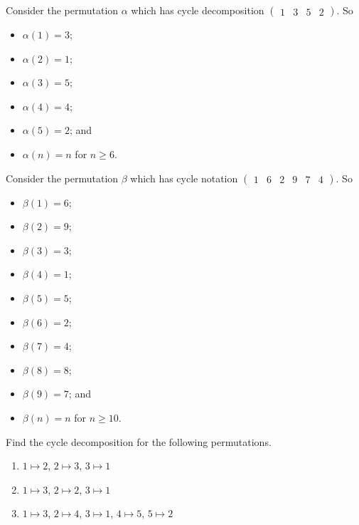 \begin{example}
    Consider the permutation $\alpha$ which has cycle decomposition $\begin{pmatrix}1 & 3 & 5 & 2\end{pmatrix}$. So
    \begin{multicols}{2}
        \begin{itemize}
            \item $\alpha(1) = 3$;
            \item $\alpha(2) = 1$;
            \item $\alpha(3) = 5$;
            \item $\alpha(4) = 4$;
            \item $\alpha(5) = 2$; and
            \item $\alpha(n) = n$ for $n \geq 6$.
        \end{itemize}
    \end{multicols}
\end{example}

\newpage

\begin{example}
    Consider the permutation $\beta$ which has cycle notation $\begin{pmatrix}1 & 6 & 2 & 9 & 7 & 4\end{pmatrix}$. So
    \begin{multicols}{2}
        \begin{itemize}
            \item $\beta(1) = 6$;
            \item $\beta(2) = 9$;
            \item $\beta(3) = 3$;
            \item $\beta(4) = 1$;
            \item $\beta(5) = 5$;
            \item $\beta(6) = 2$;
            \item $\beta(7) = 4$;
            \item $\beta(8) = 8$;
            \item $\beta(9) = 7$; and
            \item $\beta(n) = n$ for $n \geq 10$.
        \end{itemize}
    \end{multicols}
\end{example}

\begin{exercise}
    Find the cycle decomposition for the following permutations.
    \begin{enumerate}[label=(\alph*)]
        \item $1 \mapsto 2$, $2 \mapsto 3$, $3 \mapsto 1$
        \item $1 \mapsto 3$, $2 \mapsto 2$, $3 \mapsto 1$
        \item $1 \mapsto 3$, $2 \mapsto 4$, $3 \mapsto 1$, $4 \mapsto 5$, $5 \mapsto 2$
    \end{enumerate}
\end{exercise}

